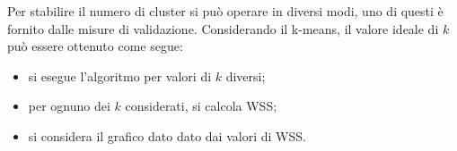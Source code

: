 \documentclass{subfiles}
\begin{document}
Per stabilire il numero di cluster si può operare in diversi modi, uno di questi è fornito dalle misure di validazione.
Considerando il k-means, il valore ideale di $k$ può essere ottenuto come segue:
\begin{itemize}
    \item si esegue l'algoritmo per valori di $k$ diversi;
    \item per ognuno dei $k$ considerati, si calcola WSS;
    \item si considera il grafico dato dato dai valori di WSS.
\end{itemize}
\end{document}
